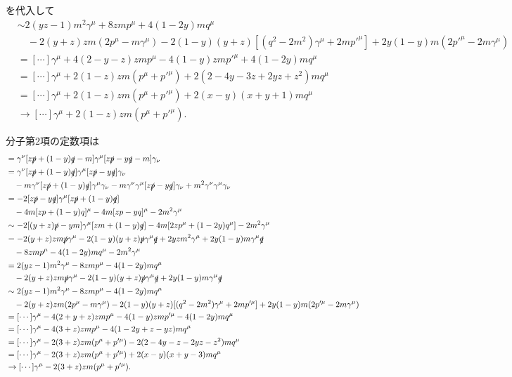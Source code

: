 を代入して
\begin{align*}
  &\sim 2(yz-1) m^2\gamma^\mu + 8zmp^\mu + 4(1-2y)mq^\mu \\
  &\quad -2(y+z)zm (2p^\mu - m\gamma^\mu) - 2(1-y)(y+z) [(q^2-2m^2) \gamma^\mu + 2mp'^\mu] + 2y(1-y)m (2p'^\mu - 2m\gamma^\mu) \\
  &= [\cdots] \gamma^\mu + 4(2-y-z)zmp^\mu - 4(1-y)zmp'^\mu + 4(1-2y)mq^\mu \\
  &= [\cdots] \gamma^\mu + 2(1-z)zm(p^\mu+p'^\mu) + 2(2-4y-3z+2yz+z^2)mq^\mu \\
  &= [\cdots] \gamma^\mu + 2(1-z)zm(p^\mu+p'^\mu) + 2(x-y)(x+y+1)mq^\mu \\
  &\to [\cdots] \gamma^\mu + 2(1-z)zm(p^\mu+p'^\mu) .
\end{align*}

分子第2項の定数項は
\begin{align*}
  &= \gamma^\nu [z\slashed{p}+(1-y)\slashed{q}-m] \gamma^\mu [z\slashed{p}-y\slashed{q}-m] \gamma_\nu \\
  &= \gamma^\nu [z\slashed{p}+(1-y)\slashed{q}] \gamma^\mu [z\slashed{p}-y\slashed{q}] \gamma_\nu \\
  &\quad - m \gamma^\nu [z\slashed{p}+(1-y)\slashed{q}] \gamma^\mu \gamma_\nu
  - m \gamma^\nu \gamma^\mu [z\slashed{p}-y\slashed{q}] \gamma_\nu
  + m^2\gamma^\nu \gamma^\mu \gamma_\nu \\
  &= -2 [z\slashed{p}-y\slashed{q}] \gamma^\mu [z\slashed{p}+(1-y)\slashed{q}] \\
  &\quad - 4m [zp+(1-y)q]^\mu - 4m [zp-yq]^\mu - 2m^2 \gamma^\mu \\
  &\sim -2 [(y+z)\slashed{p}-ym] \gamma^\mu [zm+(1-y)\slashed{q}] - 4m [2zp^\mu+(1-2y)q^\mu] - 2m^2 \gamma^\mu \\
  &= -2(y+z)zm\slashed{p}\gamma^\mu - 2(1-y)(y+z)\slashed{p}\gamma^\mu\slashed{q} + 2yzm^2\gamma^\mu + 2y(1-y)m \gamma^\mu\slashed{q} \\
  &\quad - 8zmp^\mu - 4(1-2y)mq^\mu - 2m^2 \gamma^\mu \\
  &= 2(yz-1) m^2\gamma^\mu - 8zmp^\mu - 4(1-2y)mq^\mu \\
  &\quad -2(y+z)zm\slashed{p}\gamma^\mu - 2(1-y)(y+z)\slashed{p}\gamma^\mu\slashed{q} + 2y(1-y)m \gamma^\mu\slashed{q} \\
  &\sim 2(yz-1) m^2\gamma^\mu - 8zmp^\mu - 4(1-2y)mq^\mu \\
  &\quad -2(y+z)zm (2p^\mu - m\gamma^\mu) - 2(1-y)(y+z) [(q^2-2m^2) \gamma^\mu + 2mp'^\mu] + 2y(1-y)m (2p'^\mu - 2m\gamma^\mu) \\
  &= [\cdots] \gamma^\mu - 4(2+y+z)zmp^\mu - 4(1-y)zmp'^\mu - 4(1-2y)mq^\mu \\
  &= [\cdots] \gamma^\mu - 4(3+z)zmp^\mu - 4(1-2y+z-yz)mq^\mu \\
  &= [\cdots] \gamma^\mu - 2(3+z)zm(p^\mu+p'^\mu) - 2(2-4y-z-2yz-z^2)mq^\mu \\
  &= [\cdots] \gamma^\mu - 2(3+z)zm(p^\mu+p'^\mu) + 2(x-y)(x+y-3) mq^\mu \\
  &\to [\cdots] \gamma^\mu - 2(3+z)zm(p^\mu+p'^\mu) .
\end{align*}

